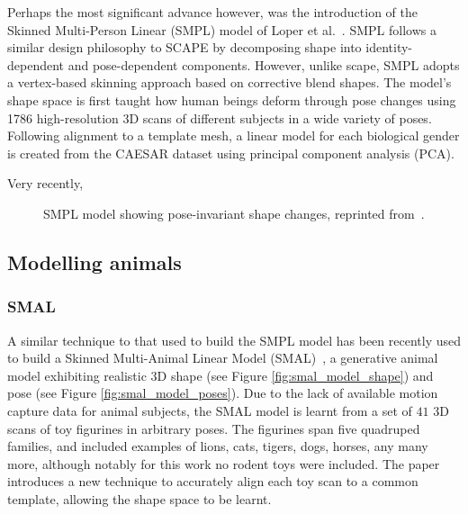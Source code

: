 Perhaps the most significant advance however, was the introduction of the Skinned Multi-Person Linear (SMPL) model of Loper et al.~\cite{loper15smpl}. SMPL follows a similar design philosophy to SCAPE by decomposing shape into identity-dependent and pose-dependent components. However, unlike scape, SMPL adopts a vertex-based skinning approach based on corrective blend shapes. The model's shape space is first taught how human beings deform through pose changes using 1786 high-resolution 3D scans of different subjects in a wide variety of poses. Following alignment to a template mesh, a linear model for each biological gender is created from the CAESAR dataset \cite{robinette2002civilian} using principal component analysis (PCA). 


Very recently, 

\begin{figure}[H] %
    \caption{SMPL model showing pose-invariant shape changes, reprinted from~\cite{loper15smpl}.}
    \label{fig:smpl_model}
\end{figure}

\subsection{Modelling animals}

\subsubsection{SMAL}
A similar technique to that used to build the SMPL model has been recently used to build a Skinned Multi-Animal Linear Model (SMAL)~\cite{zuffi2017menagerie}, a generative animal model exhibiting realistic 3D shape (see Figure \ref{fig:smal_model_shape}) and pose (see Figure \ref{fig:smal_model_poses}). Due to the lack of available motion capture data for animal subjects, the SMAL model is learnt from a set of $41$ 3D scans of toy figurines in arbitrary poses. The figurines span five quadruped families, and included examples of lions, cats, tigers, dogs, horses, any many more, although notably for this work no rodent toys were included. The paper introduces a new technique to accurately align each toy scan to a common template, allowing the shape space to be learnt.

